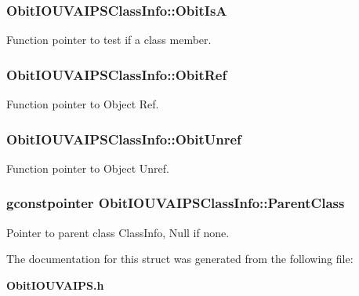 \subsubsection{ {\bf Obit\-IOUVAIPSClass\-Info::Obit\-Is\-A}}\label{structObitIOUVAIPSClassInfo_o12}


Function pointer to test if a class member. 

\subsubsection{ {\bf Obit\-IOUVAIPSClass\-Info::Obit\-Ref}}\label{structObitIOUVAIPSClassInfo_o10}


Function pointer to Object Ref. 

\subsubsection{ {\bf Obit\-IOUVAIPSClass\-Info::Obit\-Unref}}\label{structObitIOUVAIPSClassInfo_o11}


Function pointer to Object Unref. 

\subsubsection{\setlength{\rightskip}{0pt plus 5cm}gconstpointer {\bf Obit\-IOUVAIPSClass\-Info::Parent\-Class}}\label{structObitIOUVAIPSClassInfo_o3}


Pointer to parent class Class\-Info, Null if none. 



The documentation for this struct was generated from the following file:\begin{CompactItemize}
\item 
{\bf Obit\-IOUVAIPS.h}\end{CompactItemize}
